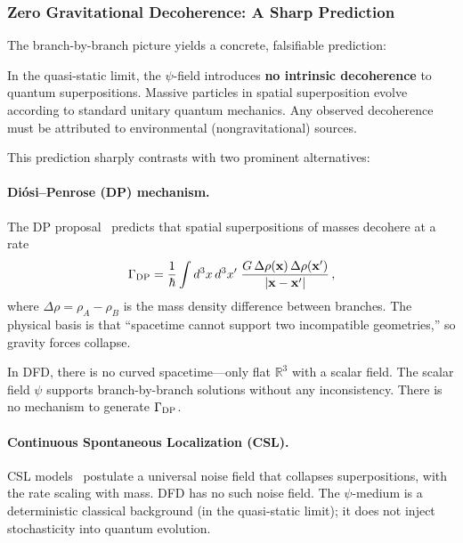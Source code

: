 \subsubsection{Zero Gravitational Decoherence: A Sharp Prediction}\label{sec:zero-decoherence}

The branch-by-branch picture yields a concrete, falsifiable prediction:

\begin{tcolorbox}[colback=green!5!white, colframe=green!60!black, title=DFD Prediction: Zero Gravitational Decoherence]
In the quasi-static limit, the $\psi$-field introduces \textbf{no intrinsic decoherence} to quantum superpositions.  Massive particles in spatial superposition evolve according to standard unitary quantum mechanics.  Any observed decoherence must be attributed to environmental (nongravitational) sources.
\end{tcolorbox}

This prediction sharply contrasts with two prominent alternatives:

\paragraph{Di\'osi--Penrose (DP) mechanism.}
The DP proposal~\cite{Diosi1989,Penrose1996} predicts that spatial superpositions of masses decohere at a rate
\begin{equation}\label{eq:dp-rate}
\Gamma_{\rm DP} = \frac{1}{\hbar}\int d^3x\,d^3x'\;\frac{G\,\Delta\rho(\mathbf{x})\,\Delta\rho(\mathbf{x}')}{|\mathbf{x} - \mathbf{x}'|}\,,
\end{equation}
where $\Delta\rho = \rho_A - \rho_B$ is the mass density difference between branches.  The physical basis is that ``spacetime cannot support two incompatible geometries,'' so gravity forces collapse.

In DFD, there is no curved spacetime---only flat $\mathbb{R}^3$ with a scalar field.  The scalar field $\psi$ supports branch-by-branch solutions without any inconsistency.  There is no mechanism to generate $\Gamma_{\rm DP}$.

\paragraph{Continuous Spontaneous Localization (CSL).}
CSL models~\cite{Bassi2013} postulate a universal noise field that collapses superpositions, with the rate scaling with mass.  DFD has no such noise field.  The $\psi$-medium is a deterministic classical background (in the quasi-static limit); it does not inject stochasticity into quantum evolution.

